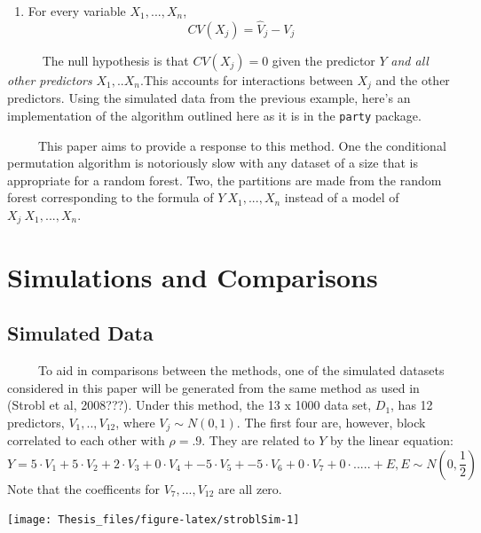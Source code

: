\documentclass[12pt,twoside]{reedthesis}
\providecommand{\tightlist}{%
  \setlength{\itemsep}{0pt}\setlength{\parskip}{0pt}}
\begin{document}
  \begin{enumerate}
  \def\labelenumi{\arabic{enumi}.}
  \setcounter{enumi}{2}
  \tightlist
  \item
    For every variable \(X_1,..., X_n\), \[CV(X_j) = \hat{V}_j - V_j\]
  \end{enumerate}
  
  ~~~~~ The null hypothesis is that \(CV(X_j) = 0\) given the predictor
  \(Y\) \emph{and all other predictors} \(X_1,..X_n\).This accounts for
  interactions between \(X_j\) and the other predictors. Using the
  simulated data from the previous example, here's an implementation of
  the algorithm outlined here as it is in the \texttt{party} package.
  
  ~~~~~This paper aims to provide a response to this method. One the
  conditional permutation algorithm is notoriously slow with any dataset
  of a size that is appropriate for a random forest. Two, the partitions
  are made from the random forest corresponding to the formula of
  \(Y~X_1,...,X_n\) instead of a model of \(X_j~X_1,...,X_n\).
  
  \chapter{Simulations and Comparisons}\label{simulations-and-comparisons}
  
  \section{Simulated Data}\label{simulated-data}
  
  ~~~~~To aid in comparisons between the methods, one of the simulated
  datasets considered in this paper will be generated from the same method
  as used in (Strobl et al, 2008???). Under this method, the 13 x 1000
  data set, \(D_1\), has 12 predictors, \(V_1,..,V_{12}\), where
  \(V_j \sim N(0,1)\). The first four are, however, block correlated to
  each other with \(\rho = .9\). They are related to \(Y\) by the linear
  equation:
  \[Y = 5 \cdot V_1 + 5 \cdot V_2 + 2 \cdot V_3 + 0 \cdot V_4 + -5 \cdot V_5 + -5\cdot V_6 + 0\cdot V_7 + 0 \cdot ..... + E, E \sim N(0,\frac 1 2 )\]
  Note that the coefficents for \(V_7,...,V_{12}\) are all zero.
  
  \begin{center}\texttt{[image: Thesis\_files/figure-latex/stroblSim-1]} \end{center}
  
\end{document}
